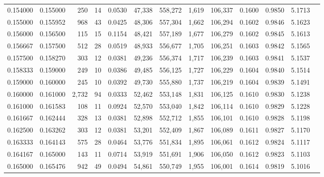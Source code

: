 \begin{tabular}{rrrrrrrrrrrrr}
0.154000 & 0.155000 &   250 &  14 &                                     0.0530 &  47,338 & 558,272 &   1,619 & 106,337 & 0.1600 & 0.9850 & 5.1713 \\
0.155000 & 0.155952 &   968 &  43 &                                     0.0425 &  48,306 & 557,304 &   1,662 & 106,294 & 0.1602 & 0.9846 & 5.1623 \\
0.156000 & 0.156500 &   115 &  15 &                                     0.1154 &  48,421 & 557,189 &   1,677 & 106,279 & 0.1602 & 0.9845 & 5.1613 \\
0.156667 & 0.157500 &   512 &  28 &                                     0.0519 &  48,933 & 556,677 &   1,705 & 106,251 & 0.1603 & 0.9842 & 5.1565 \\
0.157500 & 0.158270 &   303 &  12 &                                     0.0381 &  49,236 & 556,374 &   1,717 & 106,239 & 0.1603 & 0.9841 & 5.1537 \\
0.158333 & 0.159000 &   249 &  10 &                                     0.0386 &  49,485 & 556,125 &   1,727 & 106,229 & 0.1604 & 0.9840 & 5.1514 \\
0.159000 & 0.160000 &   245 &  10 &                                     0.0392 &  49,730 & 555,880 &   1,737 & 106,219 & 0.1604 & 0.9839 & 5.1491 \\
0.160000 & 0.161000 & 2,732 &  94 &                                     0.0333 &  52,462 & 553,148 &   1,831 & 106,125 & 0.1610 & 0.9830 & 5.1238 \\
0.161000 & 0.161583 &   108 &  11 &                                     0.0924 &  52,570 & 553,040 &   1,842 & 106,114 & 0.1610 & 0.9829 & 5.1228 \\
0.161667 & 0.162444 &   328 &  13 &                                     0.0381 &  52,898 & 552,712 &   1,855 & 106,101 & 0.1610 & 0.9828 & 5.1198 \\
0.162500 & 0.163262 &   303 &  12 &                                     0.0381 &  53,201 & 552,409 &   1,867 & 106,089 & 0.1611 & 0.9827 & 5.1170 \\
0.163333 & 0.164143 &   575 &  28 &                                     0.0464 &  53,776 & 551,834 &   1,895 & 106,061 & 0.1612 & 0.9824 & 5.1117 \\
0.164167 & 0.165000 &   143 &  11 &                                     0.0714 &  53,919 & 551,691 &   1,906 & 106,050 & 0.1612 & 0.9823 & 5.1103 \\
0.165000 & 0.165476 &   942 &  49 &                                     0.0494 &  54,861 & 550,749 &   1,955 & 106,001 & 0.1614 & 0.9819 & 5.1016 \\

\end{tabular}
